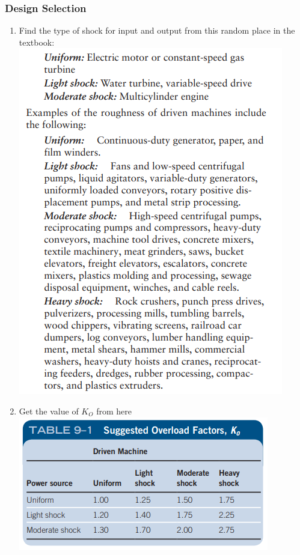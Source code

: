 \documentclass[11pt, fleqn]{article}
\begin{document}
\subsubsection{Design Selection}
\begin{enumerate}
    \item Find the type of shock for input and output from this random place in the textbook:\\
    \includegraphics[scale=1]{Gears/Shock.png}
    \item Get the value of $K_O$ from here\\
    \includegraphics[scale=1]{Gears/9-1.png}

\end{enumerate}
\end{document}
